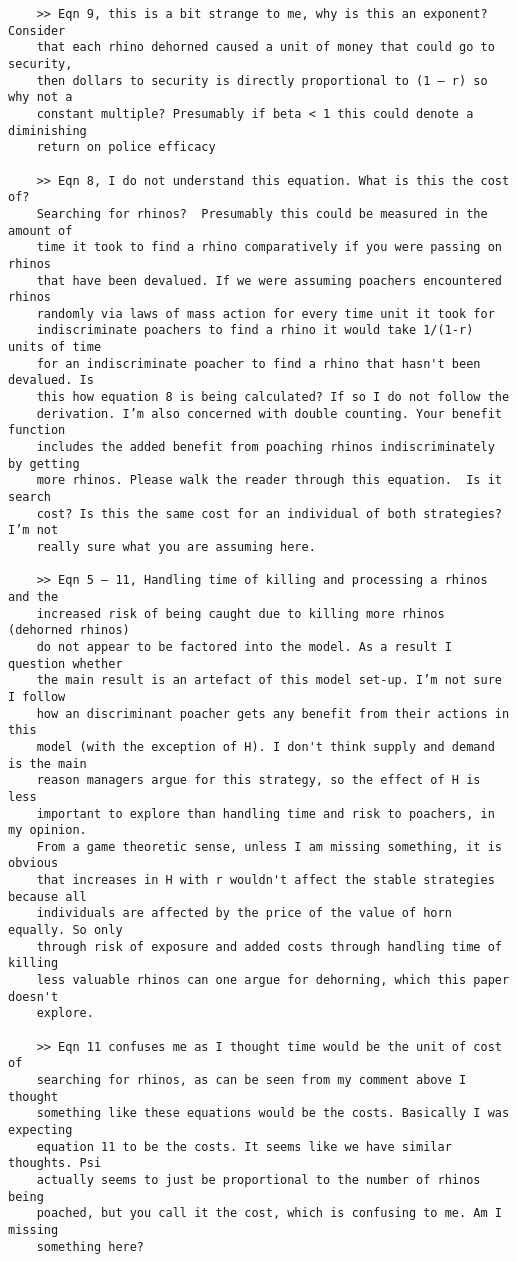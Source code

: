 \documentclass[10pt]{article}
\begin{document}
\begin{verbatim}
    >> Eqn 9, this is a bit strange to me, why is this an exponent? Consider
    that each rhino dehorned caused a unit of money that could go to security,
    then dollars to security is directly proportional to (1 – r) so why not a
    constant multiple? Presumably if beta < 1 this could denote a diminishing
    return on police efficacy

    >> Eqn 8, I do not understand this equation. What is this the cost of?
    Searching for rhinos?  Presumably this could be measured in the amount of
    time it took to find a rhino comparatively if you were passing on rhinos
    that have been devalued. If we were assuming poachers encountered rhinos
    randomly via laws of mass action for every time unit it took for
    indiscriminate poachers to find a rhino it would take 1/(1-r) units of time
    for an indiscriminate poacher to find a rhino that hasn't been devalued. Is
    this how equation 8 is being calculated? If so I do not follow the
    derivation. I’m also concerned with double counting. Your benefit function
    includes the added benefit from poaching rhinos indiscriminately by getting
    more rhinos. Please walk the reader through this equation.  Is it search
    cost? Is this the same cost for an individual of both strategies? I’m not
    really sure what you are assuming here.

    >> Eqn 5 – 11, Handling time of killing and processing a rhinos and the
    increased risk of being caught due to killing more rhinos (dehorned rhinos)
    do not appear to be factored into the model. As a result I question whether
    the main result is an artefact of this model set-up. I’m not sure I follow
    how an discriminant poacher gets any benefit from their actions in this
    model (with the exception of H). I don't think supply and demand is the main
    reason managers argue for this strategy, so the effect of H is less
    important to explore than handling time and risk to poachers, in my opinion.
    From a game theoretic sense, unless I am missing something, it is obvious
    that increases in H with r wouldn't affect the stable strategies because all
    individuals are affected by the price of the value of horn equally. So only
    through risk of exposure and added costs through handling time of killing
    less valuable rhinos can one argue for dehorning, which this paper doesn't
    explore.

    >> Eqn 11 confuses me as I thought time would be the unit of cost of
    searching for rhinos, as can be seen from my comment above I thought
    something like these equations would be the costs. Basically I was expecting
    equation 11 to be the costs. It seems like we have similar thoughts. Psi
    actually seems to just be proportional to the number of rhinos being
    poached, but you call it the cost, which is confusing to me. Am I missing
    something here?
\end{verbatim}
\end{document}
